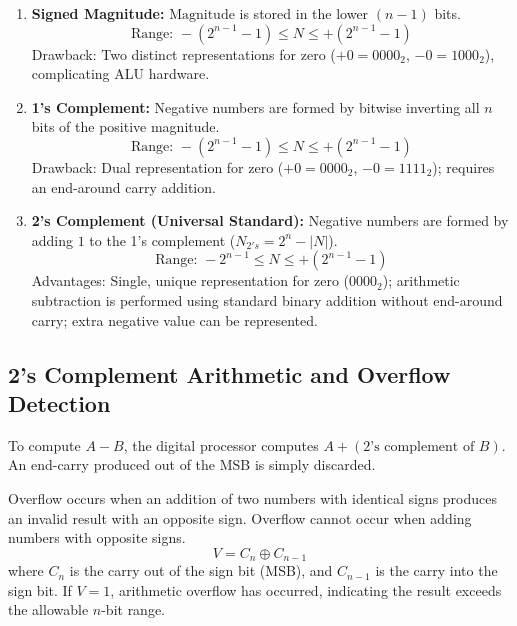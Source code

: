 \documentclass[12pt,a4paper]{article}
\begin{document}
\begin{tcolorbox}[defbox, title={\textbf{Three Signed Number Representations ($n$-bit)}}]
\begin{enumerate}[label=\arabic*., leftmargin=*]
  \item \textbf{Signed Magnitude:}
    $\text{Magnitude}$ is stored in the lower $(n-1)$ bits.
    \begin{equation}
      \text{Range: } -(2^{n-1}-1) \le N \le +(2^{n-1}-1)
    \end{equation}
    Drawback: Two distinct representations for zero ($+0 = 0000_2$, $-0 = 1000_2$), complicating ALU hardware.
  \item \textbf{1's Complement:}
    Negative numbers are formed by bitwise inverting all $n$ bits of the positive magnitude.
    \begin{equation}
      \text{Range: } -(2^{n-1}-1) \le N \le +(2^{n-1}-1)
    \end{equation}
    Drawback: Dual representation for zero ($+0 = 0000_2$, $-0 = 1111_2$); requires an end-around carry addition.
  \item \textbf{2's Complement (Universal Standard):}
    Negative numbers are formed by adding $1$ to the 1's complement ($N_{2's} = 2^n - |N|$).
    \begin{equation}
      \text{Range: } -2^{n-1} \le N \le +(2^{n-1}-1)
    \end{equation}
    Advantages: Single, unique representation for zero ($0000_2$); arithmetic subtraction is performed using standard binary addition without end-around carry; extra negative value can be represented.
\end{enumerate}
\end{tcolorbox}

\subsection{2's Complement Arithmetic and Overflow Detection}
To compute $A - B$, the digital processor computes $A + (\text{2's complement of } B)$. An end-carry produced out of the MSB is simply discarded.

\begin{tcolorbox}[formulabox, title={\textbf{Arithmetic Overflow Rule in 2's Complement}}]
Overflow occurs when an addition of two numbers with identical signs produces an invalid result with an opposite sign. Overflow cannot occur when adding numbers with opposite signs.
\begin{equation}
  V = C_n \oplus C_{n-1}
\end{equation}
where $C_n$ is the carry out of the sign bit (MSB), and $C_{n-1}$ is the carry into the sign bit. If $V = 1$, arithmetic overflow has occurred, indicating the result exceeds the allowable $n$-bit range.
\end{tcolorbox}
\end{document}
